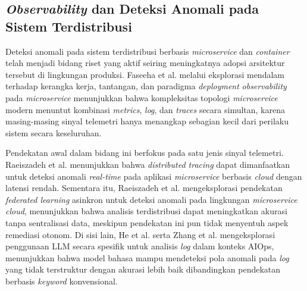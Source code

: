\subsection{\textit{Observability} dan Deteksi Anomali pada Sistem Terdistribusi}

Deteksi anomali pada sistem terdistribusi berbasis \textit{microservice} dan \textit{container} telah menjadi bidang riset yang aktif seiring meningkatnya adopsi arsitektur tersebut di lingkungan produksi. Faseeha et al. \cite{faseeha2025observability} melalui eksplorasi mendalam terhadap kerangka kerja, tantangan, dan paradigma \textit{deployment} \textit{observability} pada \textit{microservice} menunjukkan bahwa kompleksitas topologi \textit{microservice} modern menuntut kombinasi \textit{metrics}, \textit{log}, dan \textit{traces} secara simultan, karena masing-masing sinyal telemetri hanya menangkap sebagian kecil dari perilaku sistem secara keseluruhan.

Pendekatan awal dalam bidang ini berfokus pada satu jenis sinyal telemetri. Raeiszadeh et al. \cite{raeiszadeh2023real} menunjukkan bahwa \textit{distributed tracing} dapat dimanfaatkan untuk deteksi anomali \textit{real-time} pada aplikasi \textit{microservice} berbasis \textit{cloud} dengan latensi rendah. Sementara itu, Raeiszadeh et al. \cite{raeiszadeh2025asynchronous} mengeksplorasi pendekatan \textit{federated learning} asinkron untuk deteksi anomali pada lingkungan \textit{microservice} \textit{cloud}, menunjukkan bahwa analisis terdistribusi dapat meningkatkan akurasi tanpa sentralisasi data, meskipun pendekatan ini pun tidak menyentuh aspek remediasi otonom. Di sisi lain, He et al. \cite{he2024llmelog} serta Zhang et al. \cite{zhang2024large} mengeksplorasi penggunaan LLM secara spesifik untuk analisis \textit{log} dalam konteks AIOps, menunjukkan bahwa model bahasa mampu mendeteksi pola anomali pada \textit{log} yang tidak terstruktur dengan akurasi lebih baik dibandingkan pendekatan berbasis \textit{keyword} konvensional.

